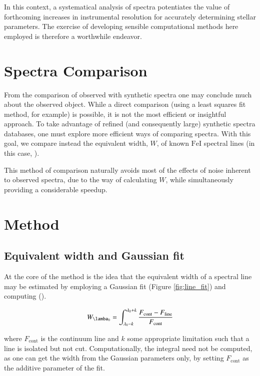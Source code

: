 \documentclass{aa}
\begin{document}
In this context, a systematical analysis of spectra potentiates the value of
forthcoming increases in instrumental resolution for accurately determining
stellar parameters. The exercise of developing sensible computational methods
here employed is therefore a worthwhile endeavor.

\section{Spectra Comparison}

From the comparison of observed with synthetic spectra one may conclude
much about the observed object. While a direct comparison (using a least squares
fit method, for example) is possible, it is not the most efficient or insightful
approach. To take advantage of refined (and consequently large) synthetic spectra
databases, one must explore more efficient ways of comparing spectra. With this
goal, we compare instead the equivalent width, $W$, of known $\mathrm{FeI}$
spectral lines (in this case, \cite{tsantaki_deriving_2013}).

This method of comparison naturally avoids most of the effects of noise inherent to
observed spectra, due to the way of calculating $W$, while simultaneously providing a
considerable speedup.

\section{Method}

\subsection{Equivalent width and Gaussian fit}

At the core of the method is the idea that the equivalent width of a spectral
line may be estimated by employing a Gaussian fit (Figure
\ref{fig:line_fit}) and computing (\cite{monteiro_sebenta_2019}).

\begin{equation}
  \label{eq:W_estimation}
  W_{\lamba_0} = \int_{\lambda_0 - k}^{\lambda_0 + k} \frac{F_{\text{cont}} - F_{\text{line}}}{F_{\text{cont}}}
\end{equation}

where $F_{\text{cont}}$ is the continuum line and $k$ some appropriate
limitation such that a line is isolated but not cut. Computationally, the
integral need not be computed, as one can get the width from the Gaussian
parameters only, by setting $F_{\text{cont}}$ as the additive parameter of the fit.
\end{document}
